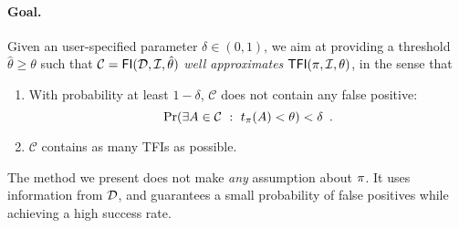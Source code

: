 \paragraph{Goal.} Given an user-specified
parameter $\delta\in(0,1)$, we aim at providing a threshold
$\hat{\theta}\ge\theta$ such that $\mathcal{C}=\mathsf{FI}({\cal D},{\cal I},\hat{\theta})$
\emph{well approximates} $\mathsf{TFI}(\pi,{\cal I},\theta)$, in the sense that 
\begin{enumerate}
  \item With probability at least $1-\delta$, $\mathcal{C}$ does not contain any
    false positive: %
  \[
  \Pr(\exists A\in\mathcal{C} ~:~ t_\pi(A)<\theta)<\delta\enspace.\]
\item $\mathcal{C}$ contains as many TFIs as possible.

  \end{enumerate}
The %
method we present does not make \emph{any} assumption about %
$\pi$. It uses information from ${\cal D}$, and guarantees a small probability of
false positives while achieving a high success rate.


